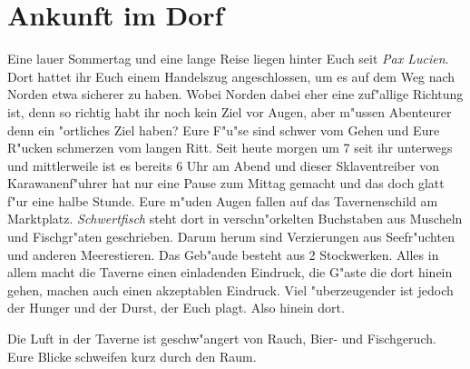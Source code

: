 \chapter{Ankunft im Dorf}
\par Eine lauer Sommertag und eine lange Reise liegen hinter Euch seit \textit{Pax Lucien}. Dort hattet ihr Euch einem Handelszug angeschlossen, um es auf dem Weg nach Norden etwa sicherer zu haben. Wobei Norden dabei eher eine zuf"allige Richtung ist, denn so richtig habt ihr noch kein Ziel vor Augen, aber m"ussen Abenteurer denn ein "ortliches Ziel haben? Eure F"u"se sind schwer vom Gehen und Eure R"ucken schmerzen vom langen Ritt. Seit heute morgen um 7 seit ihr unterwegs und mittlerweile ist es bereits 6 Uhr am Abend und dieser Sklaventreiber von Karawanenf"uhrer hat nur eine Pause zum Mittag gemacht und das doch glatt f"ur eine halbe Stunde. Eure m"uden Augen fallen auf das Tavernenschild am Marktplatz. \textit{Schwertfisch} steht dort in verschn"orkelten Buchstaben aus Muscheln und Fischgr"aten geschrieben. Darum herum sind Verzierungen aus Seefr"uchten und anderen Meerestieren. Das Geb"aude besteht aus 2 Stockwerken. Alles in allem macht die Taverne einen einladenden Eindruck, die G"aste die dort hinein gehen, machen auch einen akzeptablen Eindruck. Viel "uberzeugender ist jedoch der Hunger und der Durst, der Euch plagt. Also hinein dort.

\par Die Luft in der Taverne ist geschw"angert von Rauch, Bier- und Fischgeruch. Eure Blicke schweifen kurz durch den Raum.

